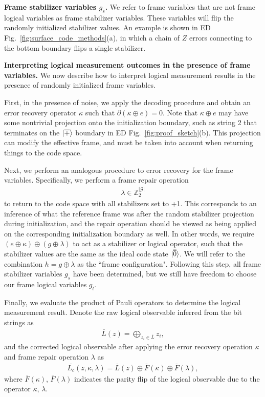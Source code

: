 \textbf{Frame stabilizer variables $g_s$.}
%
We refer to frame variables that are not frame logical variables as frame stabilizer variables.
%
These variables will flip the randomly initialized stabilizer values.
%
An example is shown in ED Fig.~\ref{fig:surface_code_methods}(a), in which a chain of $Z$ errors connecting to the bottom boundary flips a single stabilizer.

\textbf{Interpreting logical measurement outcomes in the presence of frame variables.}
%
We now describe how to interpret logical measurement results in the presence of randomly initialized frame variables.

First, in the presence of noise, we apply the decoding procedure and obtain an error recovery operator $\kappa$ such that $\partial(\kappa\oplus e)=0$.
%
Note that $\kappa\oplus e$ may have some nontrivial projection onto the initialization boundary, such as string 2 that terminates on the $|{\overline{+}}\rangle$ boundary in ED Fig.~\ref{fig:proof_sketch}(b).
%
This projection can modify the effective frame, and must be taken into account when returning things to the code space.

Next, we perform an analogous procedure to error recovery for the frame variables.
%
Specifically, we perform a frame repair operation
\begin{align}
\lambda\in \mathbb{Z}_2^{|\mathcal{G}|}
\end{align}
to return to the code space with all stabilizers set to +1.
%
This corresponds to an inference of what the reference frame was after the random stabilizer projection during initialization, and the repair operation should be viewed as being applied on the corresponding initialization boundary as well.
%
In other words, we require $(e\oplus\kappa)\oplus(g\oplus\lambda)$ to act as a stabilizer or logical operator, such that the stabilizer values are the same as the ideal code state $|\overline{\overline{0}}\rangle$.
%
We will refer to the combination $h=g\oplus\lambda$ as the ``frame configuration".
%
Following this step, all frame stabilizer variables $g_s$ have been determined, but we still have freedom to choose our frame logical variables $g_l$.

Finally, we evaluate the product of Pauli operators to determine the logical measurement result.
%
Denote the raw logical observable inferred from the bit strings as
\begin{align}
\overline{L}(z)=\bigoplus_{z_i\in \overline{L}} z_i,
\end{align}
and the corrected logical observable after applying the error recovery operation $\kappa$ and frame repair operation $\lambda$ as \begin{align}
\overline{L_c}(z,\kappa,\lambda)=\overline{L}(z)\oplus \overline{F}(\kappa)\oplus \overline{F}(\lambda),
\end{align}
where $\overline{F}(\kappa)$, $\overline{F}(\lambda)$ indicates the parity flip of the logical observable due to the operator $\kappa$, $\lambda$.

